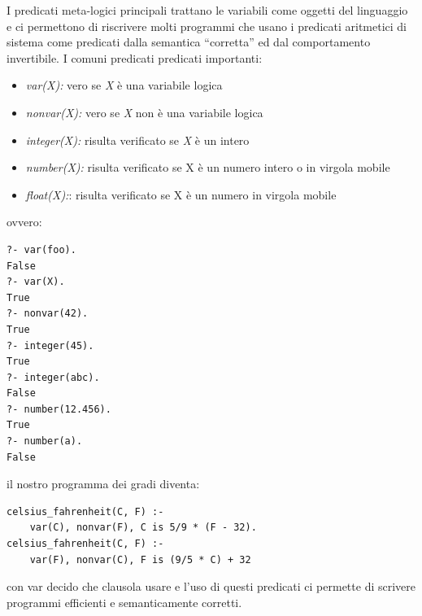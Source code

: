 I predicati meta-logici principali trattano le variabili come oggetti del linguaggio e ci permettono di riscrivere molti programmi
che usano i predicati aritmetici di sistema come predicati dalla semantica “corretta” ed dal comportamento invertibile.\newline
I comuni predicati predicati importanti:
\begin{itemize}
\item \textit{var(X):}  vero se \textit{X} è una variabile logica
\item \textit{nonvar(X):}  vero se \textit{X} non è una variabile logica
\item \textit{integer(X):} risulta verificato se \textit{X} è un intero
\item \textit{number(X):} risulta verificato se X è un numero intero o in virgola mobile
\item \textit{float(X):}: risulta verificato se X è un numero in virgola mobile
\end{itemize}
ovvero:
\begin{verbatim}
?- var(foo).
False
?- var(X).
True
?- nonvar(42).
True
?- integer(45).
True
?- integer(abc).
False
?- number(12.456).
True
?- number(a).
False
\end{verbatim}
il nostro programma dei gradi diventa:
\begin{verbatim}
celsius_fahrenheit(C, F) :-
	var(C), nonvar(F), C is 5/9 * (F - 32).
celsius_fahrenheit(C, F) :-
	var(F), nonvar(C), F is (9/5 * C) + 32
\end{verbatim}
con var decido che clausola usare e l'uso di questi predicati ci permette di scrivere programmi efficienti e semanticamente corretti.

